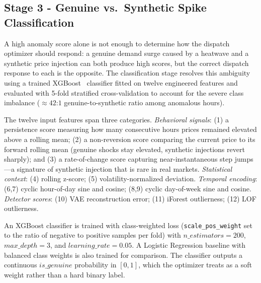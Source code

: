\documentclass[journal]{IEEEtran}
\begin{document}
\subsection{Stage 3 - Genuine vs.\ Synthetic Spike Classification}
A high anomaly score alone is not enough to determine how the dispatch optimizer should respond: a genuine demand surge caused by a heatwave and a synthetic price injection can both produce high scores, but the correct dispatch response to each is the opposite. The classification stage resolves this ambiguity using a trained XGBoost~\cite{XGBoost} classifier fitted on twelve engineered features and evaluated with 5-fold stratified cross-validation to account for the severe class imbalance (${\approx}42$:$1$ genuine-to-synthetic ratio among anomalous hours).

The twelve input features span three categories. \emph{Behavioral signals}: (1) a persistence score measuring how many consecutive hours prices remained elevated above a rolling mean; (2) a non-reversion score comparing the current price to its forward rolling mean (genuine shocks stay elevated, synthetic injections revert sharply); and (3) a rate-of-change score capturing near-instantaneous step jumps---a signature of synthetic injection that is rare in real markets. \emph{Statistical context}: (4) rolling z-score; (5) volatility-normalized deviation. \emph{Temporal encoding}: (6,7) cyclic hour-of-day sine and cosine; (8,9) cyclic day-of-week sine and cosine. \emph{Detector scores}: (10) VAE reconstruction error; (11) iForest outlierness; (12) LOF outlierness.

An XGBoost classifier is trained with class-weighted loss (\texttt{scale\_pos\_weight} set to the ratio of negative to positive samples per fold) with $n\_estimators = 200$, $max\_depth = 3$, and $learning\_rate = 0.05$. A Logistic Regression baseline with balanced class weights is also trained for comparison. The classifier outputs a continuous $is\_genuine$ probability in $[0, 1]$, which the optimizer treats as a soft weight rather than a hard binary label.
\end{document}
